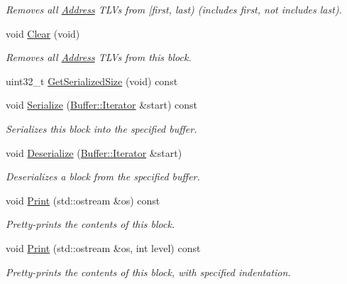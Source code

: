 \begin{DoxyCompactItemize}
\begin{DoxyCompactList}\small\item\em Removes all \hyperlink{classns3_1_1Address}{Address} T\+L\+Vs from \mbox{[}first, last) (includes first, not includes last). \end{DoxyCompactList}\item 
void \hyperlink{classns3_1_1PbbAddressTlvBlock_ada52cd9586d80cac400cf9e1195371c9}{Clear} (void)
\begin{DoxyCompactList}\small\item\em Removes all \hyperlink{classns3_1_1Address}{Address} T\+L\+Vs from this block. \end{DoxyCompactList}\item 
uint32\+\_\+t \hyperlink{classns3_1_1PbbAddressTlvBlock_aa9297b16639b68454fbd518221614b54}{Get\+Serialized\+Size} (void) const 
\item 
void \hyperlink{classns3_1_1PbbAddressTlvBlock_a7344724acb884c59fed16212109a2e26}{Serialize} (\hyperlink{classns3_1_1Buffer_1_1Iterator}{Buffer\+::\+Iterator} \&start) const 
\begin{DoxyCompactList}\small\item\em Serializes this block into the specified buffer. \end{DoxyCompactList}\item 
void \hyperlink{classns3_1_1PbbAddressTlvBlock_a736e01808c85dbf4ae9a50872b5c8736}{Deserialize} (\hyperlink{classns3_1_1Buffer_1_1Iterator}{Buffer\+::\+Iterator} \&start)
\begin{DoxyCompactList}\small\item\em Deserializes a block from the specified buffer. \end{DoxyCompactList}\item 
void \hyperlink{classns3_1_1PbbAddressTlvBlock_ad864181947f00f1fe5a5292d18d964bf}{Print} (std\+::ostream \&os) const 
\begin{DoxyCompactList}\small\item\em Pretty-\/prints the contents of this block. \end{DoxyCompactList}\item 
void \hyperlink{classns3_1_1PbbAddressTlvBlock_a6a49d38b6589c560b8b5f9c508c19a05}{Print} (std\+::ostream \&os, int level) const 
\begin{DoxyCompactList}\small\item\em Pretty-\/prints the contents of this block, with specified indentation. \end{DoxyCompactList}\item 

\end{DoxyCompactItemize}
